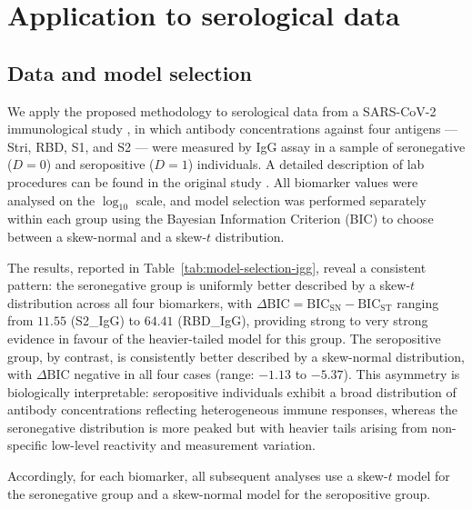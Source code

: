 \documentclass[11pt,a4paper]{article}
\theoremstyle{definition}
\theoremstyle{remark}
\newcommand{\1}{\mathbf{1}}
\begin{document}
\section{Application to serological data}
\label{sec:application}

\subsection{Data and model selection}
\label{sec:data-model-selection}

We apply the proposed methodology to serological data from
a SARS-CoV-2 immunological study \cite{rosado2020multiplex}, in which antibody concentrations against four antigens --- Stri, RBD, S1, and
S2 --- were measured by IgG assay in a sample of
seronegative ($D=0$) and seropositive ($D=1$) individuals. A detailed description of lab procedures can be found in the original study \cite{rosado2020multiplex}.
All biomarker values were analysed on the $\log_{10}$ scale,
and model selection was performed separately within each
group using the Bayesian Information Criterion (BIC) to
choose between a skew-normal and a skew-$t$ distribution. 

The results, reported in Table~\ref{tab:model-selection-igg},
reveal a consistent pattern: the seronegative group is
uniformly better described by a skew-$t$ distribution across
all four biomarkers, with $\Delta\mathrm{BIC}=
\mathrm{BIC}_\mathrm{SN}-\mathrm{BIC}_\mathrm{ST}$
ranging from $11.55$ (S2\_IgG) to $64.41$ (RBD\_IgG),
providing strong to very strong evidence in favour of the
heavier-tailed model for this group.
The seropositive group, by contrast, is consistently
better described by a skew-normal distribution, with
$\Delta\mathrm{BIC}$ negative in all four cases
(range: $-1.13$ to $-5.37$).
This asymmetry is biologically interpretable: seropositive
individuals exhibit a broad distribution of antibody
concentrations reflecting heterogeneous immune responses,
whereas the seronegative distribution is more peaked but
with heavier tails arising from non-specific low-level
reactivity and measurement variation.

Accordingly, for each biomarker, all subsequent analyses
use a skew-$t$ model for the seronegative group and a
skew-normal model for the seropositive group.
\end{document}
